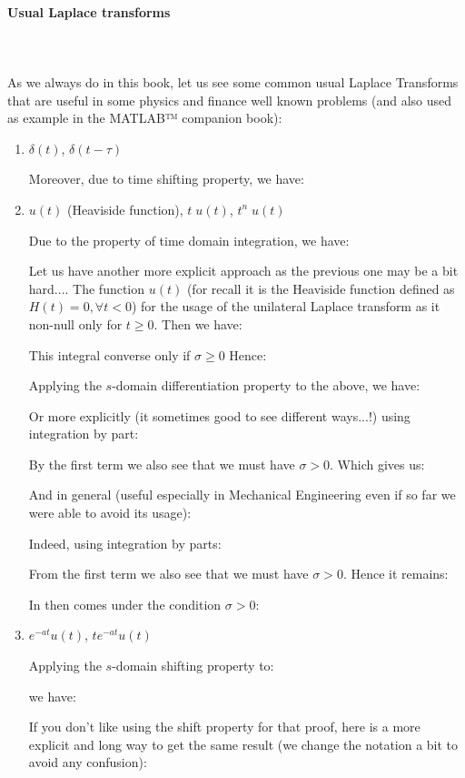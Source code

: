 	\paragraph{Usual Laplace transforms}\mbox{}\\\\
	As we always do in this book, let us see some common usual Laplace Transforms that are useful in some physics and finance well known problems (and also used as example in the MATLAB™ companion book):
	\begin{enumerate}
		\item $\delta(t)$, $\delta(t-\tau)$
		
		
		Moreover, due to time shifting property, we have:
		
		
		\item $u(t)$ (Heaviside function), $t\;u(t)$, $t^n\;u(t)$
		
		Due to the property of time domain integration, we have:
		
		Let us have another more explicit approach as the previous one may be a bit hard.... The function $u(t)$ (for recall it is the Heaviside function defined as $H(t)=0,\forall t<0$) for the usage of the unilateral Laplace transform as it non-null only for $t\geq 0$. Then we have:
		
		This integral converse only if $\sigma \geq 0$ Hence:
		
		
		Applying the $s$-domain differentiation property to the above, we have:
		
		Or more explicitly (it sometimes good to see different ways...!) using integration by part:
		
		By the first term we also see that we must have $\sigma>0$. Which gives us:
		
		
		And in general (useful especially in Mechanical Engineering even if so far we were able to avoid its usage):
		
		Indeed, using integration by parts:
		
		From the first term we also see that we must have $\sigma >0$. Hence it remains:
		
		In then comes under the condition $\sigma>0$:
		
		
		\item $e^{-at}u(t)$, $te^{-at}u(t)$
		
		Applying the $s$-domain shifting property to:
		
		we have:
		
		If you don't like using the shift property for that proof, here is a more explicit and long way to get the same result (we change the notation a bit to avoid any confusion):
		

\end{enumerate}
